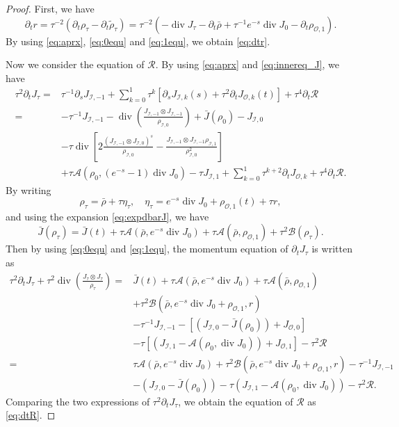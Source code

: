 \documentclass[english]{amsart}
\theoremstyle{plain}
\theoremstyle{definition}
\theoremstyle{remark}
\theoremstyle{plain}
\theoremstyle{plain}
\theoremstyle{plain}
\def\d{{\partial}}
\DeclareMathOperator{\diver}{div}
\numberwithin{equation}{section}
\begin{document}
\begin{proof}
First, we have
\[
\d_t r=\tau^{-2}(\d_t\rho_\tau-\d_t\tilde \rho_\tau)=\tau^{-2}(-\diver J_\tau-\d_t\bar\rho+\tau^{-1}e^{-s}\diver J_0-\d_t\rho_{\mathcal{O},1}).
\]
By using \eqref{eq:aprx}, \eqref{eq:0equ} and \eqref{eq:1equ}, we obtain \eqref{eq:dtr}. 

Now we consider the equation of $\mathcal{R}$. By using \eqref{eq:aprx} and \eqref{eq:innereq_J}, we have
\begin{align*}
\tau^2\d_t J_\tau=&\tau^{-1}\d_s J_{\mathcal{I},-1}+\sum_{k=0}^1 \tau^k\left[\d_s J_{\mathcal{I},k}(s)+\tau^2\d_t J_{\mathcal{O},k}(t)\right]+\tau^4 \d_t\mathcal{R}\\
=&-\tau^{-1}J_{\mathcal{I},-1}-\diver\left(\frac{J_{\mathcal{I},-1}\otimes J_{\mathcal{I},-1}}{\rho_{\mathcal{I},0}}\right)+\bar J(\rho_{0})-J_{\mathcal{I},0}\\
&-\tau\diver\left[2\frac{(J_{\mathcal{I},-1}\otimes J_{\mathcal{I},0})^s}{\rho_{\mathcal{I},0}}-\frac{J_{\mathcal{I},-1}\otimes J_{\mathcal{I},-1}\rho_{\mathcal{I},1}}{\rho_{\mathcal{I},0}^2}\right]\\
&+\tau\mathcal{A}(\rho_{0},(e^{-s}-1)\diver J_0)-\tau J_{\mathcal{I},1}+\sum_{k=0}^1 \tau^{k+2}\d_t J_{\mathcal{O},k}+\tau^4 \d_t\mathcal{R}.
\end{align*}
By writing
\[
\rho_\tau=\bar\rho+\tau\eta_\tau,\quad \eta_\tau=e^{-s}\diver J_0+\rho_{\mathcal{O},1}(t)+\tau r,
\]
and using the expansion \eqref{eq:expdbarJ}, we have
\[
\bar J(\rho_\tau)=\bar J(t)+\tau\mathcal{A}(\bar\rho,e^{-s}\diver J_0)+\tau\mathcal{A}(\bar\rho,\rho_{\mathcal{O},1})+\tau^2\mathcal{B}(\rho_\tau).
\]
Then by using \eqref{eq:0equ} and \eqref{eq:1equ}, the momentum equation of $\d_t J_\tau$ is written as
\begin{align*}
\tau^2\d_tJ_\tau+\tau^2\diver \left(\frac{J_\tau\otimes J_\tau}{\rho_\tau}\right)=&\bar J(t)+\tau\mathcal{A}(\bar\rho,e^{-s}\diver J_0)+\tau\mathcal{A}(\bar\rho,\rho_{\mathcal{O},1})\\
&+\tau^2\mathcal{B}(\bar\rho,e^{-s}\diver J_0+\rho_{\mathcal{O},1},r)\\
&-\tau^{-1}J_{\mathcal{I},-1}-[(J_{\mathcal{I},0}-\bar J(\rho_0))+J_{\mathcal{O},0}]\\
&-\tau[(J_{\mathcal{I},1}-\mathcal{A}(\rho_0,\diver J_0))+J_{\mathcal{O},1}]-\tau^2\mathcal{R}\\
=&\tau\mathcal{A}(\bar\rho,e^{-s}\diver J_0)+\tau^2\mathcal{B}(\bar\rho,e^{-s}\diver J_0+\rho_{\mathcal{O},1},r)-\tau^{-1}J_{\mathcal{I},-1}\\
&-(J_{\mathcal{I},0}-\bar J(\rho_0))-\tau (J_{\mathcal{I},1}-\mathcal{A}(\rho_0,\diver J_0))-\tau^2\mathcal{R}.
\end{align*}
Comparing the two expressions of $\tau^2\d_tJ_\tau$, we obtain the equation of $\mathcal{R}$ as \eqref{eq:dtR}.

\end{proof}
\end{document}
